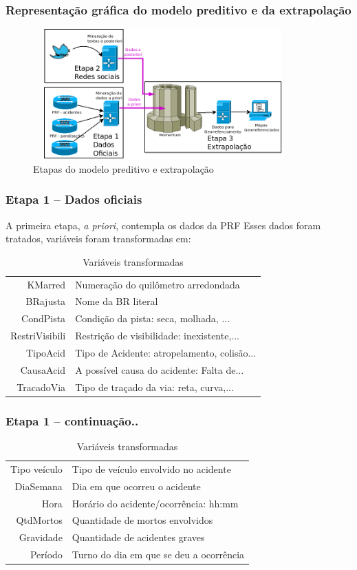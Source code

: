 \documentclass[11pt]{beamer}
\begin{document}
\begin{frame}\frametitle{ Representação gráfica do modelo preditivo e da extrapolação}
	\transboxout[duration=2, direction=25]
	\begin{figure}[ht]
		\centering
		\includegraphics[width=100mm, height=50mm]{Figuras/Metodologia/metodologiaGeral3.png}
		\caption{Etapas do modelo preditivo e extrapolação}		
	\end{figure}
\end{frame}

\begin{frame}\frametitle{ Etapa 1 -- Dados oficiais}
 A primeira etapa, \textit{a priori}, contempla os dados da PRF
 Esses dados foram tratados, variáveis foram transformadas em:\begin{table}[htbp!]
 	\centering
 	\caption{Variáveis transformadas} 
 	\begin{tabular}{r|l} \hline
 		KMarred & Numeração do quilômetro arredondada \\
 		BRajusta & Nome da BR literal\\
 		CondPista & Condição da pista: seca, molhada, ... \\
 		RestriVisibili & Restrição de visibilidade: inexistente,... \\
 		TipoAcid & Tipo de Acidente: atropelamento, colisão...\\
 		CausaAcid & A possível causa do acidente: Falta de... \\
 		TracadoVia & Tipo de traçado da via: reta, curva,... \\
 	\end{tabular}
 \end{table}
\end{frame}

\begin{frame}\frametitle{ Etapa 1 -- continuação..}
	\begin{table}[htbp!]
		\centering
	 	\caption{Variáveis transformadas} 
		 \begin{tabular}{r|l} \hline 
		 		Tipo veículo & Tipo de veículo envolvido no acidente \\
		 		DiaSemana & Dia em que ocorreu o acidente\\
		 		Hora & Horário do acidente/ocorrência: hh:mm \\
		 		QtdMortos & Quantidade de mortos envolvidos \\
		 		Gravidade & Quantidade de acidentes graves \\
		 		Período & Turno do dia em que se deu a ocorrência \\
		\end{tabular}
	\end{table}
\end{frame}
\end{document}
